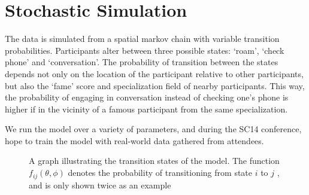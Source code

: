 \documentclass{article}
\begin{document}
\section*{Stochastic Simulation}

The data is simulated from a spatial markov chain with variable transition probabilities. Participants alter between three possible states: ‘roam’, ‘check phone’ and ‘conversation’. The probability of transition between the states depends not only on the location of the participant relative to other participants, but also the ‘fame’ score and specialization field of nearby participants. 
This way, the probability of engaging in conversation instead of checking one’s phone is higher if in the vicinity of a famous participant from the same specialization. 

We run the model over a variety of parameters, and during the SC14 conference, hope to train the model with real-world data gathered from attendees.

\begin{figure}[hptb!]
\centering
{}
\caption{A graph illustrating the transition states of the model.  The function $f_{ij}(\theta,\phi)$ denotes the probability of transitioning from state $i$ to $j$ , and is only shown twice as an example} \label{fig:diagram}
\end{figure}


\end{document}
